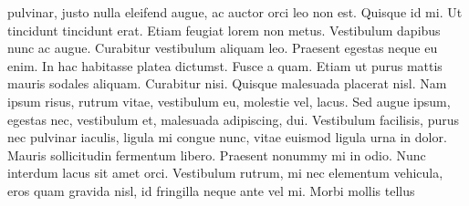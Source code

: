pulvinar, justo nulla eleifend augue, ac auctor orci leo non est. Quisque id mi. Ut tincidunt tincidunt erat. Etiam feugiat lorem non metus. Vestibulum dapibus nunc ac augue. Curabitur vestibulum aliquam leo. Praesent egestas neque eu enim. In hac habitasse platea dictumst. Fusce a quam. Etiam ut purus mattis mauris sodales aliquam. Curabitur nisi. Quisque malesuada placerat nisl. Nam ipsum risus, rutrum vitae, vestibulum eu, molestie vel, lacus. Sed augue ipsum, egestas nec, vestibulum et, malesuada adipiscing, dui. Vestibulum facilisis, purus nec pulvinar iaculis, ligula mi congue nunc, vitae euismod ligula urna in dolor. Mauris sollicitudin fermentum libero. Praesent nonummy mi in odio. Nunc interdum lacus sit amet orci. Vestibulum rutrum, mi nec elementum vehicula, eros quam gravida nisl, id fringilla neque ante vel mi. Morbi mollis tellus

